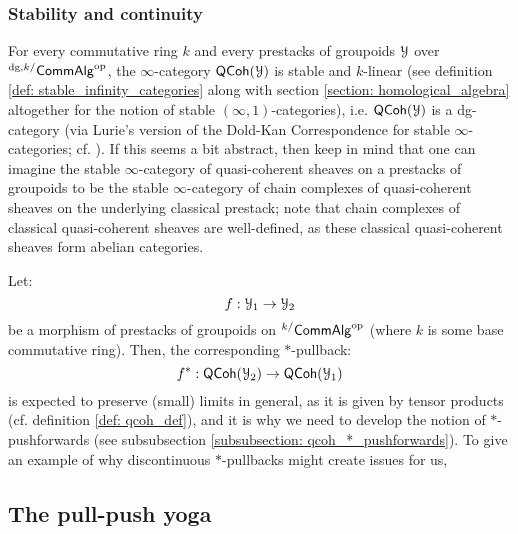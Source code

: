             \subsubsection{Stability and continuity}
                \begin{remark} \label{remark: dg_qcoh_categories}
                    For every commutative ring $k$ and every prestacks of groupoids $\mathcal{Y}$ over ${}^{\mathrm{dg}, k/}\mathsf{Comm}\mathsf{Alg}^{\mathrm{op}}$, the $\infty$-category $\mathsf{QCoh}(\mathcal{Y})$ is stable and $k$-linear (see definition \ref{def: stable_infinity_categories} along with section \ref{section: homological_algebra} altogether for the notion of stable $(\infty, 1)$-categories), i.e. $\mathsf{QCoh}(\mathcal{Y})$ is a dg-category (via Lurie's version of the Dold-Kan Correspondence for stable $\infty$-categories; cf. \cite[Theorem 1.2.3.7]{HA}). If this seems a bit abstract, then keep in mind that one can imagine the stable $\infty$-category of quasi-coherent sheaves on a prestacks of groupoids to be the stable $\infty$-category of chain complexes of quasi-coherent sheaves on the underlying classical prestack; note that chain complexes of classical quasi-coherent sheaves are well-defined, as these classical quasi-coherent sheaves form abelian categories. 
                \end{remark}
                
                \begin{remark} \label{remark: *_pullbacks_discontinuity}
                    Let:
                        $$f: \mathcal{Y}_1 \to \mathcal{Y}_2$$
                    be a morphism of prestacks of groupoids on ${}^{k/}\mathsf{Comm}\mathsf{Alg}^{\mathrm{op}}$ (where $k$ is some base commutative ring). Then, the corresponding $*$-pullback:
                        $$f^*: \mathsf{QCoh}(\mathcal{Y}_2) \to \mathsf{QCoh}(\mathcal{Y}_1)$$
                    is expected to preserve (small) limits in general, as it is given by tensor products (cf. definition \ref{def: qcoh_def}), and it is why we need to develop the notion of $*$-pushforwards (see subsubsection \ref{subsubsection: qcoh_*_pushforwards}). To give an example of why discontinuous $*$-pullbacks might create issues for us, 
                \end{remark}
        
        \subsection{The pull-push yoga}
